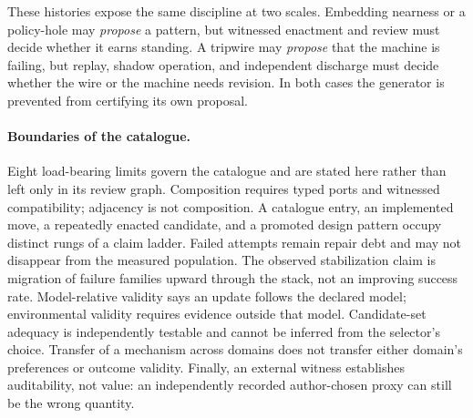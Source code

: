 These histories expose the same discipline at two scales.  Embedding nearness
or a policy-hole may \emph{propose} a pattern, but witnessed enactment and review
must decide whether it earns standing.  A tripwire may \emph{propose} that the
machine is failing, but replay, shadow operation, and independent discharge must
decide whether the wire or the machine needs revision.  In both cases the
generator is prevented from certifying its own proposal.

\paragraph{Boundaries of the catalogue.}
Eight load-bearing limits govern the catalogue and are stated here rather than left only in its review graph.  Composition requires typed ports and witnessed compatibility; adjacency is not composition.  A catalogue entry, an implemented move, a repeatedly enacted candidate, and a promoted design pattern occupy distinct rungs of a claim ladder.  Failed attempts remain repair debt and may not disappear from the measured population.  The observed stabilization claim is migration of failure families upward through the stack, not an improving success rate.  Model-relative validity says an update follows the declared model; environmental validity requires evidence outside that model.  Candidate-set adequacy is independently testable and cannot be inferred from the selector's choice.  Transfer of a mechanism across domains does not transfer either domain's preferences or outcome validity.  Finally, an external witness establishes auditability, not value: an independently recorded author-chosen proxy can still be the wrong quantity.
